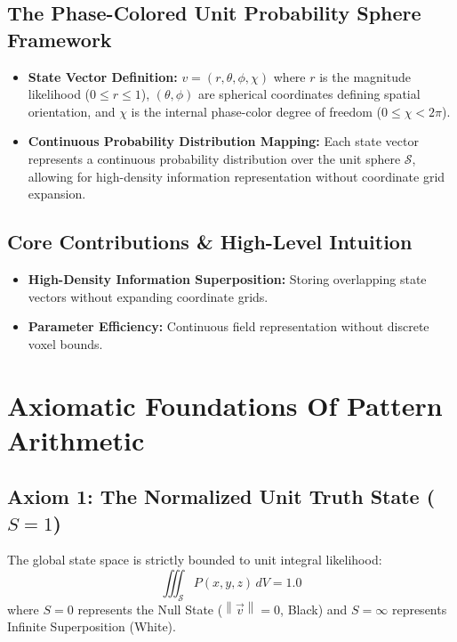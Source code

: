 \documentclass[12pt, a4paper]{article}
\providecommand{\norm}[1]{\left\lVert#1\right\rVert}
\begin{document}
\subsection{The Phase-Colored Unit Probability Sphere Framework}
\begin{itemize}
    \item \textbf{State Vector Definition:} $v = (r, \theta, \phi, \chi)$ where $r$ is the magnitude likelihood ($0 \leq r \leq 1$), $(\theta, \phi)$ are spherical coordinates defining spatial orientation, and $\chi$ is the internal phase-color degree of freedom ($0 \leq \chi < 2\pi$).
    \item \textbf{Continuous Probability Distribution Mapping:} Each state vector represents a continuous probability distribution over the unit sphere $\mathcal{S}$, allowing for high-density information representation without coordinate grid expansion.
\end{itemize}

\subsection{Core Contributions \& High-Level Intuition}
\begin{itemize}
    \item \textbf{High-Density Information Superposition:} Storing overlapping state vectors without expanding coordinate grids.
    \item \textbf{Parameter Efficiency:} Continuous field representation without discrete voxel bounds.
\end{itemize}

\section{Axiomatic Foundations Of Pattern Arithmetic}

\subsection{Axiom 1: The Normalized Unit Truth State ($S = 1$)}
\label{axiom:truth_state}
The global state space is strictly bounded to unit integral likelihood:
\begin{equation}
    \iiint_{\mathcal{S}} P(x,y,z) \, dV = 1.0
    \label{eq:unit_bound}
\end{equation}
where $S = 0$ represents the Null State ($\norm{\vec{v}} = 0$, Black) and $S = \infty$ represents Infinite Superposition (White).
\end{document}
